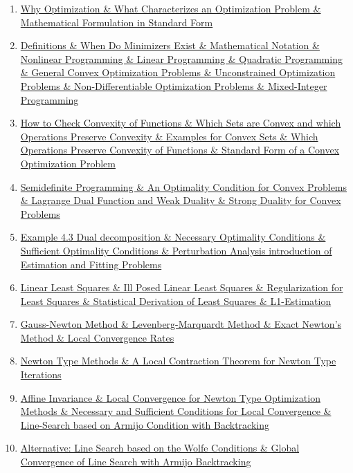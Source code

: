\documentclass[11pt]{article}
\begin{document}
\begin{enumerate}
	\item \href{https://mp.weixin.qq.com/s/cf2Ke3wDWbk7oGfdy5NK-Q}{Why Optimization \& What Characterizes an Optimization Problem \& Mathematical Formulation in Standard Form}	%
	\item \href{https://mp.weixin.qq.com/s/xwadXAGFPa1xMYFhsEwQCA}{Definitions \& When Do Minimizers Exist \& Mathematical Notation \& Nonlinear Programming \& Linear Programming \& Quadratic Programming \& General Convex Optimization Problems \& Unconstrained Optimization Problems \& Non-Differentiable Optimization Problems \& Mixed-Integer Programming}	%
	\item \href{https://mp.weixin.qq.com/s/kkwWYllrSQbStGDJlaFaSg}{How to Check Convexity of Functions \& Which Sets are Convex and which Operations Preserve Convexity \& Examples for Convex Sets \& Which Operations Preserve Convexity of Functions \& Standard Form of a Convex Optimization Problem}	%
	\item \href{https://mp.weixin.qq.com/s/sDel0I_U3c94d24_f0HFHg}{Semidefinite Programming \& An Optimality Condition for Convex Problems \& Lagrange Dual Function and Weak Duality \& Strong Duality for Convex Problems }	%
	\item \href{https://mp.weixin.qq.com/s/PpELccLIoAiqRvb3ZfWGlg}{Example 4.3 Dual decomposition \& Necessary Optimality Conditions \& Sufficient Optimality Conditions \& Perturbation Analysis introduction of Estimation and Fitting Problems}	%
	\item \href{https://mp.weixin.qq.com/s/ofj3GIBeEfZpyzw0yDQqiQ}{Linear Least Squares \& Ill Posed Linear Least Squares \& Regularization for Least Squares \& Statistical Derivation of Least Squares \& L1-Estimation}	%
	\item \href{https://mp.weixin.qq.com/s/5lUCfMPQKrtA0aFpeYKjXw}{Gauss-Newton Method \& Levenberg-Marquardt Method \& Exact Newton's Method \& Local Convergence Rates}	%
	\item \href{https://mp.weixin.qq.com/s/Tu6Cwpp0g7sQ9RtVqYv-Fg}{Newton Type Methods \& A Local Contraction Theorem for Newton Type Iterations}	%
	\item \href{https://mp.weixin.qq.com/s/gd_RFAW9SQd8Kts7a5jZbw}{Affine Invariance \& Local Convergence for Newton Type Optimization Methods \& Necessary and Sufficient Conditions for Local Convergence \& Line-Search based on Armijo Condition with Backtracking}	%
	\item \href{https://mp.weixin.qq.com/s/5VM7d6kCZ9r_kdLxzbf94w}{Alternative: Line Search based on the Wolfe Conditions \& Global Convergence of Line Search with Armijo Backtracking}	%

\end{enumerate}
\end{document}
